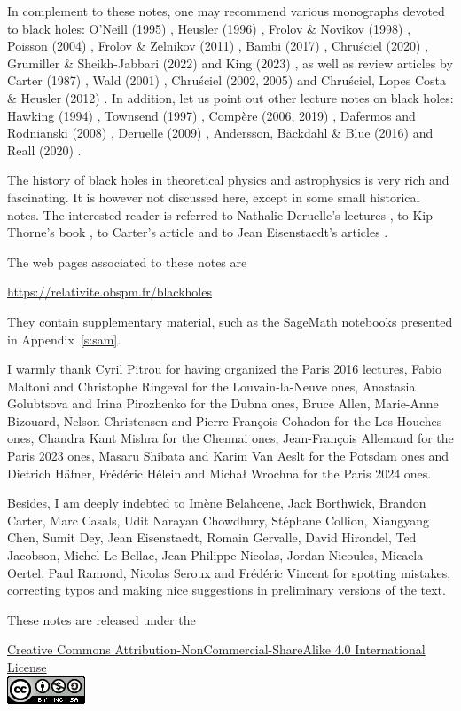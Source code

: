 \vspace{2ex}

In complement to these notes, one may recommend various monographs devoted to black holes:
O'Neill (1995) \cite{ONeil95}, Heusler (1996) \cite{Heusl96}, Frolov \& Novikov (1998) \cite{FroloN98},
Poisson (2004) \cite{Poiss04}, Frolov \& Zelnikov (2011) \cite{FroloZ11}, Bambi (2017) \cite{Bambi17},
Chru\'sciel (2020) \cite{Chrus20}, Grumiller \& Sheikh-Jabbari (2022) \cite{GrumiS22}
and King (2023) \cite{King23},
as well as review articles by
Carter (1987) \cite{Carte87}, Wald (2001) \cite{Wald01},
Chru\'sciel (2002, 2005) \cite{Chrus02, Chrus05} and Chru\'sciel, Lopes Costa \& Heusler (2012) \cite{ChrusLH12}.
In addition, let us point out other lecture notes on black holes:
Hawking (1994) \cite{Hawki94,HawkiP15}, Townsend (1997) \cite{Towns97},
Compère (2006, 2019) \cite{Compe06,Compe19}, Dafermos and Rodnianski (2008) \cite{DaferR13},
Deruelle (2009) \cite{Derue09}, Andersson, Bäckdahl \& Blue (2016) \cite{AnderBB18}
and Reall (2020) \cite{Reall20}.

The history of black holes in theoretical physics and astrophysics is
very rich and fascinating. It is however not discussed here, except in some
small historical notes. The interested
reader is referred to Nathalie Deruelle's lectures \cite{Derue09}, to Kip Thorne's
book \cite{Thorn94}, to Carter's article \cite{Carte06}
and to Jean Eisenstaedt's articles \cite{Eisen82,Eisen93}.


The web pages associated to these notes are
\begin{center}
\url{https://relativite.obspm.fr/blackholes}
\end{center}
They contain supplementary material, such as the SageMath notebooks presented in
Appendix~\ref{s:sam}.

\vspace{2ex}

I warmly thank Cyril Pitrou for having organized the Paris 2016 lectures,
Fabio Maltoni and Christophe Ringeval for the Louvain-la-Neuve ones,
Anastasia Golubtsova and Irina Pirozhenko for the Dubna ones,
Bruce Allen, Marie-Anne Bizouard, Nelson Christensen and Pierre-François Cohadon for the Les Houches ones,
Chandra Kant Mishra for the Chennai ones,
Jean-François Allemand for the Paris 2023 ones, Masaru Shibata and Karim Van Aeslt for the Potsdam ones and Dietrich Häfner, Frédéric Hélein and Michał Wrochna for the Paris 2024 ones.

Besides, I am deeply indebted to
Imène Belahcene, Jack Borthwick, Brandon Carter, Marc Casals,
Udit Narayan Chowdhury, Stéphane Collion, Xiangyang Chen,
Sumit Dey, Jean Eisenstaedt, Romain Gervalle, David Hirondel,
Ted Jacobson, Michel Le Bellac, Jean-Philippe Nicolas, Jordan Nicoules, Micaela Oertel,
Paul Ramond, Nicolas Seroux and Frédéric Vincent for spotting mistakes, correcting typos and making
nice suggestions in preliminary versions of the text.


\vspace{3ex}
These notes are released under the
\begin{center}
\href{https://creativecommons.org/licenses/by-nc-sa/4.0/}{{Creative Commons Attribution-NonCommercial-ShareAlike 4.0 International License}}\\[1ex]
\includegraphics[height=0.03\textheight]{cc_license.png}
\end{center}

